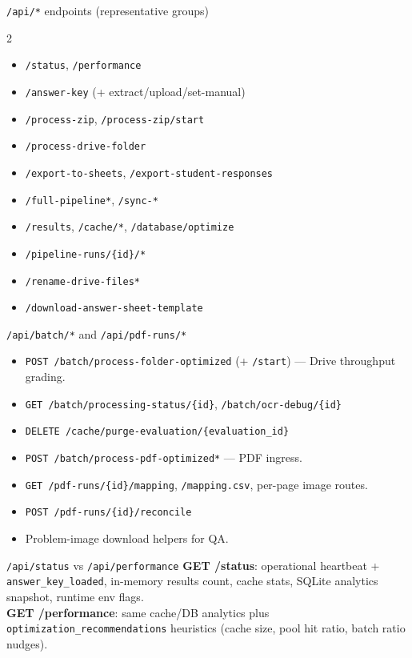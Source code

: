 \documentclass[aspectratio=169]{beamer}
\begin{document}
\begin{frame}{\texttt{/api/*} endpoints (representative groups)}
  \tiny
  \begin{multicols}{2}
    \begin{itemize}\setlength\itemsep{0.05em}
      \item \texttt{/status}, \texttt{/performance}
      \item \texttt{/answer-key} (+ extract/upload/set-manual)
      \item \texttt{/process-zip}, \texttt{/process-zip/start}
      \item \texttt{/process-drive-folder}
      \item \texttt{/export-to-sheets}, \texttt{/export-student-responses}
      \item \texttt{/full-pipeline*}, \texttt{/sync-*}
      \item \texttt{/results}, \texttt{/cache/*}, \texttt{/database/optimize}
      \item \texttt{/pipeline-runs/\{id\}/*}
      \item \texttt{/rename-drive-files*}
      \item \texttt{/download-answer-sheet-template}
    \end{itemize}
  \end{multicols}
\end{frame}

\begin{frame}{\texttt{/api/batch/*} and \texttt{/api/pdf-runs/*}}
  \tiny
  \begin{itemize}\setlength\itemsep{0.1em}
    \item \texttt{POST /batch/process-folder-optimized} (+ \texttt{/start}) --- Drive throughput grading.
    \item \texttt{GET /batch/processing-status/\{id\}}, \texttt{/batch/ocr-debug/\{id\}}
    \item \texttt{DELETE /cache/purge-evaluation/\{evaluation\_id\}}
    \item \texttt{POST /batch/process-pdf-optimized*} --- PDF ingress.
    \item \texttt{GET /pdf-runs/\{id\}/mapping}, \texttt{/mapping.csv}, per-page image routes.
    \item \texttt{POST /pdf-runs/\{id\}/reconcile}
    \item Problem-image download helpers for QA.
  \end{itemize}
\end{frame}

\begin{frame}{\texttt{/api/status} vs \texttt{/api/performance}}
  \small
  \textbf{GET /status}: operational heartbeat + \texttt{answer\_key\_loaded}, in-memory results count, cache stats, SQLite analytics snapshot, runtime env flags.\\
  \textbf{GET /performance}: same cache/DB analytics plus \texttt{optimization\_recommendations} heuristics (cache size, pool hit ratio, batch ratio nudges).
\end{frame}
\end{document}

